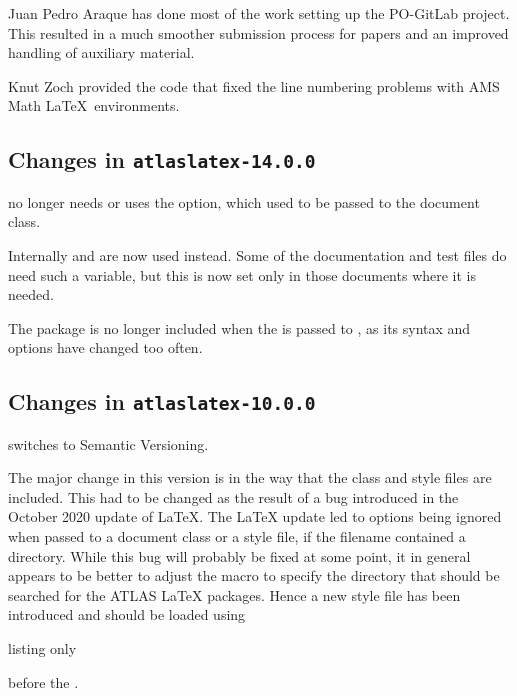 Juan Pedro Araque has done most of the work setting up the PO-GitLab project.
This resulted in a much smoother submission process for papers and
an improved handling of auxiliary material.

Knut Zoch provided the code that fixed the line numbering problems with AMS Math \LaTeX\ environments.


\subsection{Changes in \texttt{atlaslatex-14.0.0}}
\label{sec:atlaslatex14}

 no longer needs or uses the  option,
which used to be passed to the document class.

Internally  and  are now used instead.
Some of the documentation and test files do need such a variable,
but this is now set only in those documents where it is needed.

The package  is no longer included when the 
is passed to , as its syntax and options have changed too often.


\subsection{Changes in \texttt{atlaslatex-10.0.0}}
\label{sec:atlaslatex10}

 switches to Semantic Versioning.

The major change in this version is in the way that the class and style files are included.
This had to be changed as the result of a bug introduced in the October 2020 update of \LaTeX.
The \LaTeX{} update led to options being ignored when passed to a document class or a style file,
if the filename contained a directory.
While this bug will probably be fixed at some point,
it in general appears to be better to adjust the macro 
to specify the directory that should be searched for the ATLAS \LaTeX{} packages.
Hence a new style file  has been introduced and should be loaded using
\begin{tcblisting}{listing only}
\RequirePackage{latex/atlaslatexpath}
\end{tcblisting}
before the .

